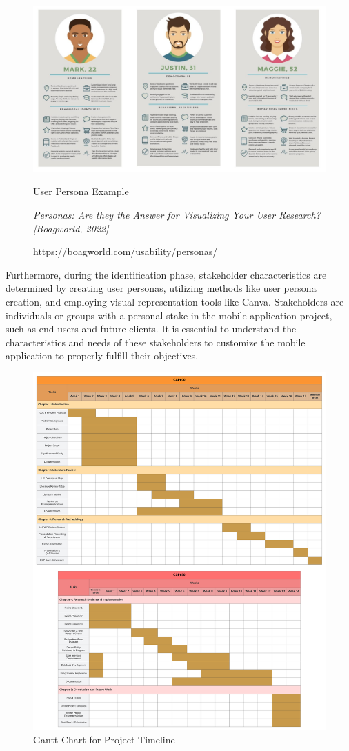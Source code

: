 \begin{figure}[h]
    \centering
    \includegraphics[width=0.8\linewidth]{mainmatter/images/exampleuserpersona.jpg}
	\caption{User Persona Example}
    \caption*{\textit{Personas: Are they the Answer for Visualizing Your User Research? [Boagworld, 2022]}}
    \caption*{https://boagworld.com/usability/personas/}
    \label{fig:myfig33}
\end{figure}

Furthermore, during the identification phase, stakeholder characteristics are determined by creating user personas, utilizing methods like user persona creation, and employing visual representation tools like Canva. Stakeholders are individuals or groups with a personal stake in the mobile application project, such as end-users and future clients. It is essential to understand the characteristics and needs of these stakeholders to customize the mobile application to properly fulfill their objectives.
\pagebreak

\begin{figure}[h]
    \centering
    \includegraphics[width=0.8\linewidth]{mainmatter/images/ganttchart.png}
	\caption{Gantt Chart for Project Timeline}
    \label{fig:myfig34}
\end{figure}


